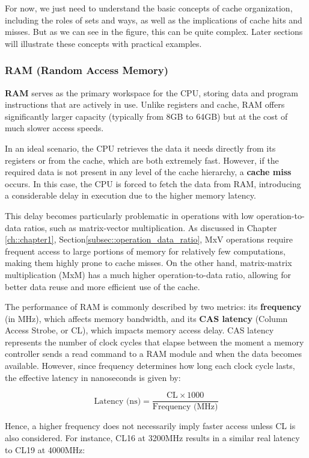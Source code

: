 For now, we just need to understand the basic concepts of cache organization, including the roles of sets and ways, as well as the implications of cache hits and misses. But as we can see in the figure, this can be quite complex. Later sections will illustrate these concepts with practical examples.
\clearpage

\subsubsection*{RAM (Random Access Memory)}

\textbf{RAM} serves as the primary workspace for the CPU, storing data and program instructions that are actively in use. Unlike registers and cache, RAM offers significantly larger capacity (typically from 8GB to 64GB) but at the cost of much slower access speeds.

In an ideal scenario, the CPU retrieves the data it needs directly from its registers or from the cache, which are both extremely fast. However, if the required data is not present in any level of the cache hierarchy, a \textbf{cache miss} occurs. In this case, the CPU is forced to fetch the data from RAM, introducing a considerable delay in execution due to the higher memory latency.

This delay becomes particularly problematic in operations with low operation-to-data ratios, such as matrix-vector multiplication. As discussed in Chapter \ref{ch::chapter1}, Section\ref{subsec::operation_data_ratio}, MxV operations require frequent access to large portions of memory for relatively few computations, making them highly prone to cache misses. On the other hand, matrix-matrix multiplication (MxM) has a much higher operation-to-data ratio, allowing for better data reuse and more efficient use of the cache.

The performance of RAM is commonly described by two metrics: its \textbf{frequency} (in MHz), which affects memory bandwidth, and its \textbf{CAS latency} \cite{caslatency} (Column Access Strobe, or CL), which impacts memory access delay. CAS latency represents the number of clock cycles that elapse between the moment a memory controller sends a read command to a RAM module and when the data becomes available. However, since frequency determines how long each clock cycle lasts, the effective latency in nanoseconds is given by:

\[
\text{Latency (ns)} = \frac{\text{CL} \times 1000}{\text{Frequency (MHz)}}
\]

Hence, a higher frequency does not necessarily imply faster access unless CL is also considered. For instance, CL16 at 3200MHz results in a similar real latency to CL19 at 4000MHz:

